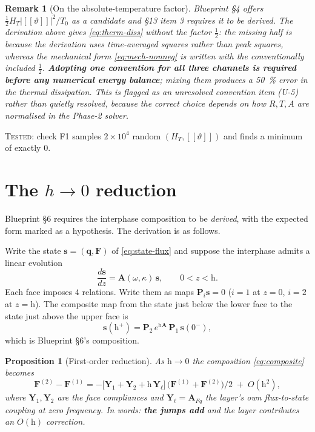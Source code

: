 \documentclass[11pt]{article}
\newcommand{\bth}{\vartheta}
\newcommand{\jmp}[1]{[\![#1]\!]}
\theoremstyle{plain}
\newtheorem{proposition}{Proposition}
\newtheorem{remark}{Remark}
\begin{document}
\begin{remark}[On the absolute-temperature factor]
\label{rem:absolute-T}
Blueprint \S4 offers $\tfrac12 H_T\lvert\jmp{\bth}\rvert^2/T_0$ as a
\emph{candidate} and \S13 item 3 requires it to be derived. The derivation above
gives \eqref{eq:therm-diss} \emph{without} the factor $\tfrac12$: the missing
half is because the derivation uses time-averaged squares rather than peak
squares, whereas the mechanical form \eqref{eq:mech-nonneg} is written with the
conventionally included $\tfrac12$. \textbf{Adopting one convention for all three
channels is required before any numerical energy balance}; mixing them produces a
50~\% error in the thermal dissipation. This is flagged as an unresolved
convention item (U-5) rather than quietly resolved, because the correct choice
depends on how $R,T,A$ are normalised in the Phase-2 solver.
\end{remark}

\textsc{Tested}: check F1 samples $2\times10^{4}$ random $(H_T,\jmp{\bth})$ and
finds a minimum of exactly $0$.

\section{The $h\to 0$ reduction}
\label{sec:h0}

Blueprint \S6 requires the interphase composition to be \emph{derived}, with the
expected form marked as a hypothesis. The derivation is as follows.

Write the state $\bm{s}=(\bm{q},\bm{F})$ of \eqref{eq:state-flux} and suppose the
interphase admits a linear evolution
\begin{equation}
  \frac{d\bm{s}}{dz} = \bm{A}(\omega,\kappa)\,\bm{s}, \qquad 0<z<\mathrm{h}.
  \label{eq:state-evolution}
\end{equation}
Each face imposes $4$ relations. Write them as maps
$\bm{P}_i\bm{s} = 0$ ($i=1$ at $z=0$, $i=2$ at $z=\mathrm{h}$). The composite
map from the state just below the lower face to the state just above the upper
face is
\begin{equation}
  \bm{s}(\mathrm{h}^{+}) = \bm{P}_2\,e^{\mathrm{h}\bm{A}}\,\bm{P}_1\,\bm{s}(0^{-}),
  \label{eq:composite}
\end{equation}
which is Blueprint \S6's composition.

\begin{proposition}[First-order reduction]
\label{prop:h0}
As $\mathrm{h}\to0$ the composition \eqref{eq:composite} becomes
\begin{equation}
  \bm{F}^{(2)}-\bm{F}^{(1)} = -\Big[\bm{Y}_1 + \bm{Y}_2 + \mathrm{h}\,\bm{Y}_{\ell}\Big]\,
  \big(\bm{F}^{(1)}+\bm{F}^{(2)}\big)/2 \;+\; O(\mathrm{h}^2),
  \label{eq:h0}
\end{equation}
where $\bm{Y}_1,\bm{Y}_2$ are the face compliances and
$\bm{Y}_\ell = \bm{A}_{Fq}$ the layer's own flux-to-state coupling at zero
frequency. In words: \textbf{the jumps add} and the layer contributes an
$O(\mathrm{h})$ correction.
\end{proposition}
\end{document}
